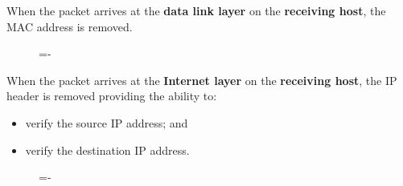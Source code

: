 \documentclass[a4paper]{systems-software}
\begin{document}
When the packet arrives at the \textbf{data link layer} on the \textbf{receiving host}, the MAC address is removed.


\begin{figure}[H]
	\lineskip=-\fboxrule
\end{figure}

When the packet arrives at the \textbf{Internet layer} on the \textbf{receiving host}, the IP header is removed providing the ability to:
\begin{itemize}
	\item verify the source IP address; and
	\item verify the destination IP address.
\end{itemize}

\begin{figure}[H]
	\lineskip=-\fboxrule
\end{figure}
\end{document}
